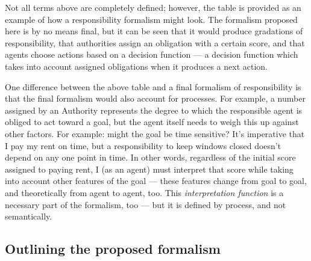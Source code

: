 Not all terms above are completely defined; however, the table is provided as an example of how a responsibility formalism might look. The formalism proposed here is by no means final, but it can be seen that it would produce gradations of responsibility, that authorities assign an obligation with a certain score, and that agents choose actions based on a decision function --- a decision function which takes into account assigned obligations when it produces a next action.\par

One difference between the above table and a final formalism of responsibility is that the final formalism would also account for processes. For example, a number assigned by an Authority represents the degree to which the responsible agent is obliged to act toward a goal, but the agent itself needs to weigh this up against other factors. For example: might the goal be time sensitive? It's imperative that I pay my rent on time, but a responsibility to keep windows closed doesn't depend on any one point in time. In other words, regardless of the initial score assigned to paying rent, I (as an agent) must interpret that score while taking into account other features of the goal --- these features change from goal to goal, and theoretically from agent to agent, too. This \emph{interpretation function} is a necessary part of the formalism, too --- but it is defined by process, and not semantically.\par


\subsection{Outlining the proposed formalism}
